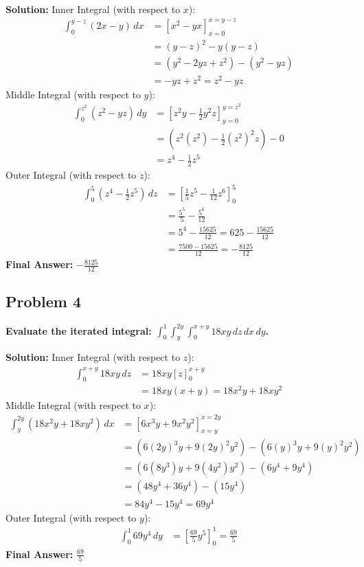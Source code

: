 \documentclass[12pt]{article}
\begin{document}
\textbf{Solution:}
Inner Integral (with respect to $x$):
\begin{align*} 
\int_{0}^{y-z} (2x - y) \, dx &= \left[ x^2 - yx \right]_{x=0}^{x=y-z} \\
&= (y-z)^2 - y(y-z) \\
&= (y^2 - 2yz + z^2) - (y^2 - yz) \\
&= -yz + z^2 = z^2 - yz
\end{align*}
Middle Integral (with respect to $y$):
\begin{align*} 
\int_{0}^{z^2} (z^2 - yz) \, dy &= \left[ z^2y - \frac{1}{2}y^2z \right]_{y=0}^{y=z^2} \\
&= \left( z^2(z^2) - \frac{1}{2}(z^2)^2z \right) - 0 \\
&= z^4 - \frac{1}{2}z^5
\end{align*}
Outer Integral (with respect to $z$):
\begin{align*} 
\int_{0}^{5} \left( z^4 - \frac{1}{2}z^5 \right) \, dz &= \left[ \frac{1}{5}z^5 - \frac{1}{12}z^6 \right]_{0}^{5} \\
&= \frac{5^5}{5} - \frac{5^6}{12} \\
&= 5^4 - \frac{15625}{12} = 625 - \frac{15625}{12} \\
&= \frac{7500 - 15625}{12} = -\frac{8125}{12}
\end{align*}
\textbf{Final Answer:} $-\frac{8125}{12}$

\vspace{0.5cm}
\subsection*{Problem 4}
\textbf{Evaluate the iterated integral: $\int_{0}^{1} \int_{y}^{2y} \int_{0}^{x+y} 18xy \, dz \, dx \, dy$.}

\textbf{Solution:}
Inner Integral (with respect to $z$):
\begin{align*} 
\int_{0}^{x+y} 18xy \, dz &= 18xy \left[ z \right]_{0}^{x+y} \\
&= 18xy(x+y) = 18x^2y + 18xy^2
\end{align*}
Middle Integral (with respect to $x$):
\begin{align*} 
\int_{y}^{2y} (18x^2y + 18xy^2) \, dx &= \left[ 6x^3y + 9x^2y^2 \right]_{x=y}^{x=2y} \\
&= \left( 6(2y)^3y + 9(2y)^2y^2 \right) - \left( 6(y)^3y + 9(y)^2y^2 \right) \\
&= \left( 6(8y^3)y + 9(4y^2)y^2 \right) - (6y^4 + 9y^4) \\
&= (48y^4 + 36y^4) - (15y^4) \\
&= 84y^4 - 15y^4 = 69y^4
\end{align*}
Outer Integral (with respect to $y$):
\begin{align*} 
\int_{0}^{1} 69y^4 \, dy &= \left[ \frac{69}{5}y^5 \right]_{0}^{1} = \frac{69}{5}
\end{align*}
\textbf{Final Answer:} $\frac{69}{5}$
\end{document}
